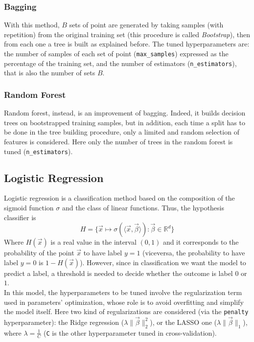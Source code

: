 \documentclass[letterpaper]{article}
\begin{document}
	\subsubsection{Bagging}
	With this method, $B$ sets of point are generated by taking samples (with repetition) from the original training set (this procedure is called \emph{Bootstrap}), then from each one a tree is built as explained before. The tuned hyperparameters are: the number of samples of each set of point (\texttt{max\_samples}) expressed as the percentage of the training set, and the number of estimators (\texttt{n\_estimators}), that is also the number of sets $B$.
	\subsubsection{Random Forest}
	Random forest, instead, is an improvement of bagging. Indeed, it builds decision trees on bootstrapped training samples, but in addition, each time a split has to be done in the tree building procedure, only a limited and random selection of features is considered. Here only the number of trees in the random forest is tuned (\texttt{n\_estimators}).
	\subsection{Logistic Regression}
	Logistic regression is a classification method based on the composition of the sigmoid function $\sigma$ and the class of linear functions. Thus, the hypothesis classifier is 
	\begin{equation}
		H = \{ \vec{x}\mapsto \sigma(\langle\vec{x},\vec{\beta}\rangle) : \vec{\beta}\in\mathbb{R}^d\}
	\end{equation}
	Where $H(\vec{x})$ is a real value in the interval $(0,1)$ and it corresponds to the probability of the point $\vec{x}$ to have label $y = 1$ (viceversa, the probability to have label $y=0$ is $1-H(\vec{x})$). However, since in classification we want the model to predict a label, a threshold is needed to decide whether the outcome is label $0$ or $1$. \\
	In this model, the hyperparameters to be tuned involve the regularization term used in parameters' optimization, whose role is to avoid overfitting and simplify the model itself. Here two kind of regularizations are considered (via the \texttt{penalty} hyperparameter): the Ridge regression ($\lambda\lVert{\vec{\beta}}\rVert^2_2$), or the LASSO one ($\lambda\lVert{\vec{\beta}}\rVert_1$), where $\lambda = \frac{1}{C}$ (\texttt{C} is the other hyperparameter tuned in cross-validation).
\end{document}
